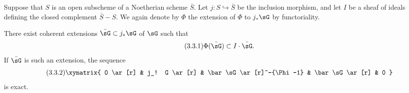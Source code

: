 \subsection{}\label{III:3-2}

Suppose that $S$ is an open subscheme of a Noetherian scheme $\bar S$. Let
$j:S\hookrightarrow \bar S$ be the inclusion morphism, and let $I$ be a
sheaf of ideals defining the closed complement $\bar S-S$. We again
denote by $\Phi$ the extension of $\Phi$ to $j_*\sG$ by functoriality.






\begin{lemma_}\label{III:3-3}
There exist coherent extensions $\bar\sG\subset j_*\sG$ of $\sG$ such that
\begin{equation*}\tag{3.3.1}\label{III:eq:3-3-1}
  \Phi(\bar\sG)\subset I\cdot \bar\sG\text{.}
\end{equation*}
If $\bar\sG$ is such an extension, the sequence
\begin{equation*}\tag{3.3.2}\label{III:eq:3-3-2}
\xymatrix{
  0 \ar[r]
    & j_! G \ar[r]
    & \bar\sG \ar[r]^-{\Phi-1}
    & \bar\sG \ar[r]
    & 0
}
\end{equation*}
is exact.
\end{lemma_}
